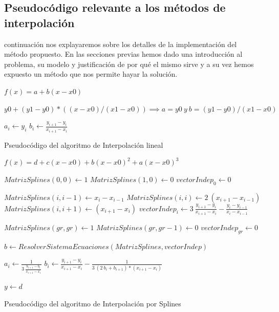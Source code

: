 \subsection{Pseudocódigo relevante a los métodos de interpolación}
\par {} continuaci\'on nos explayaremos sobre los detalles de la
implementaci\'on del m\'etodo propuesto. En las secciones previas hemos dado una
introducci\'on al problema, su modelo y justificaci\'on de por qué el mismo sirve
y a su vez hemos expuesto un m\'etodo que nos permite hayar la soluci\'on.

$f(x) = a + b (x - x0)$

$y0 + (y1-y0) * ( (x - x0) / (x1 - x0)) \implies a = y0 \ y \ b = (y1-y0)/(x1-x0)$

\begin{algorithm}
    
    {		
		$a_i \gets y_i$\;
		$b_i \gets \frac{y_{i+1} - y_{i} }{x_{i+1} - x_{i}}$\;
	}
    \caption{Pseudoc\'odigo del algoritmo de Interpolaci\'on lineal}
    \label{alg:int_lineal}
\end{algorithm}

$f(x) = d + c ( x - x0 ) + b ( x - x0)^2 + a ( x - x0)^3$

\begin{algorithm}
    
	$MatrizSplines(0,0) \gets  1$\;
	$MatrizSplines(1,0) \gets  0$\;
	$vectorIndep_0 \gets 0$\;    
    
    {		
		$MatrizSplines(i,i-1) \gets x_i - x_{i-1}$\;
		$MatrizSplines(i,i) \gets 2 \ (x_{i+1} - x_{i-1})$\;
		$MatrizSplines(i,i+1) \gets (x_{i+1} - x_i)$\;
		$vectorIndep_i \gets 3 \  \frac{y_{i+1} - y_i }{x_{i+1}- x_{i}} - \frac{y_i - y_{i-1}}{ x_i -x_{i-1}}$\;
	}    
	
	$MatrizSplines(gr,gr) \gets  1$\;
	$MatrizSplines(gr,gr-1) \gets  0$\;
	$vectorIndep_{gr} \gets 0$\; 
	
	$b \gets ResolverSistemaEcuaciones(MatrizSplines,vectorIndep)$\;
	
	{
		$a_i \gets \frac{1}{3 \ \frac{b_{i+1} - b_{i}}{x_{i+1} - x_i}}$\;
		$b_i \gets \frac{y_{i+1}- y_i}{x_{i+1}- x_i} - \frac{1}{3 \ (2 \ b_i + b_{i+1}) * (x_{i+1} - x_{i})}$\;
	}    
	
	$y \gets d$	
	
    \caption{Pseudoc\'odigo del algoritmo de Interpolaci\'on por Splines}
    \label{alg:int_splines}
\end{algorithm}


